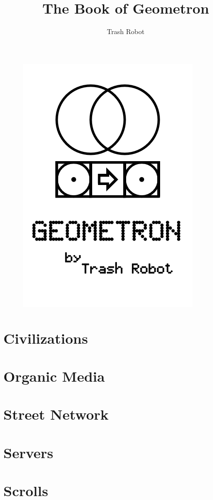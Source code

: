 \documentclass{report}
\title{The Book of Geometron}
\author{Trash Robot}
\begin{document}
\begin{figure}[htbp]
\centering
\includegraphics{cover.png}
\end{figure}


\thispagestyle{empty}
\mbox{}

\maketitle


\chapter{Civilizations}

\chapter{Organic Media}

\chapter{Street Network}

\chapter{Servers}

\chapter{Scrolls}

\end{document}
